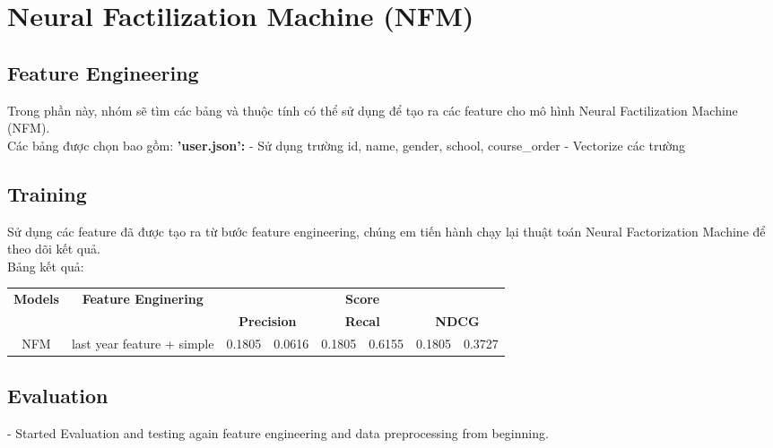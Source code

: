 \section{Neural Factilization Machine (NFM)}
\subsection{Feature Engineering}
Trong phần này, nhóm sẽ tìm các bảng và thuộc tính có thể sử dụng để tạo ra các feature cho mô hình Neural Factilization Machine (NFM).\\
Các bảng được chọn bao gồm:
\textbf{'user.json':}
- Sử dụng trường id, name, gender, school, course\_order 
- Vectorize các trường
\\
\subsection{Training}
Sử dụng các feature đã được tạo ra từ bước feature engineering, chúng em tiến hành chạy lại thuật toán Neural Factorization Machine để theo dõi kết quả.\\
Bảng kết quả:
\begin{table}[h]
    \begin{tabular}{ccclllll}
    \hline
    \multirow{2}{*}{\textbf{Models}} &
      \multirow{2}{*}{\textbf{Feature Enginering}} &
      \multicolumn{6}{c}{\textbf{Score}} \\ \cline{3-8} 
     &
       &
      \multicolumn{2}{c}{\textbf{Precision}} &
      \multicolumn{2}{c}{\textbf{Recal}} &
      \multicolumn{2}{c}{\textbf{NDCG}} \\ \hline
    NFM &
      \multicolumn{1}{l}{last year feature + simple} &
      \multicolumn{1}{l}{0.1805} &
      0.0616 &
      0.1805 &
      0.6155 &
      0.1805 &
      0.3727
\end{tabular}
\end{table}
\subsection{Evaluation}
- Started Evaluation and testing again feature engineering and data preprocessing from beginning.\\